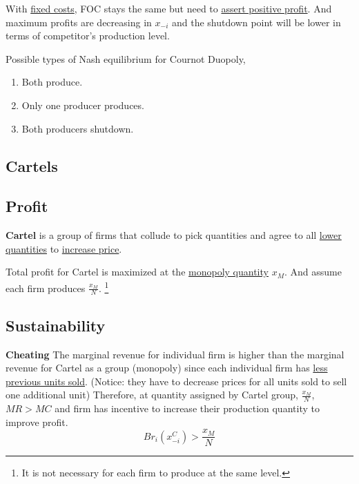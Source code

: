 \documentclass[]{article}
\begin{document}
                \begin{remark}
                    With \ul{fixed costs}, FOC stays the same but need to \ul{assert positive profit}. And maximum profits are decreasing in $x_{-i}$ and the shutdown point will be lower in terms of competitor's production level.
                \end{remark}
                
                \begin{remark}
                    Possible types of Nash equilibrium for Cournot Duopoly,
                    \begin{enumerate}
                        \item Both produce.
                        \item Only one producer produces.
                        \item Both producers shutdown.
                    \end{enumerate}
                \end{remark}
                
        \subsection{Cartels}
            \subsection{Profit}
                \begin{definition}
                    \textbf{Cartel} is a group of firms that collude to pick quantities and agree to all \ul{lower quantities} to \ul{increase price}.
                \end{definition}
                
                \begin{remark}
                    Total profit for Cartel is maximized at the \ul{monopoly quantity} $x_M$. And assume each firm produces $\frac{x_M}{N}$. \footnote{It is not necessary for each firm to produce at the same level.}
                \end{remark}
                
            \subsection{Sustainability}
                \begin{remark} \textbf{Cheating}
                    The marginal revenue for individual firm is higher than the marginal revenue for Cartel as a group (monopoly) since each individual firm has \ul{less previous units sold}. (Notice: they have to decrease prices for all units sold to sell one additional unit) Therefore, at quantity assigned by Cartel group, $\frac{x_M}{N}$, $MR > MC$ and firm has incentive to increase their production quantity to improve profit. 
                    \[
                        Br_i(x_{-i}^C) > \frac{x_M}{N}
                    \]
                \end{remark}
                
\end{document}
